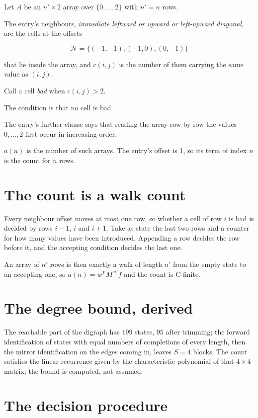\documentclass[11pt]{article}
\theoremstyle{definition}
\begin{document}
Let $A$ be an $n' \times 2$ array over $\{0,\dots,2\}$ with $n' = n$ rows.

The entry's neighbours, {\itshape immediate leftward or upward or left-upward diagonal}, are the cells at the offsets

\[\mathcal{N} = \{(-1,-1), (-1,0), (0,-1)\}\]

that lie inside the array, and $c(i,j)$ is the number of them carrying the same value as $(i,j)$.

Call a cell {\itshape bad} when $c(i,j) > 2$.

The condition is that no cell is bad.

The entry's further clause says that reading the array row by row the values $0,\dots,2$ first occur in increasing order.

$a(n)$ is the number of such arrays. The entry's offset is 1, so its term of index $n$ is the count for $n$ rows.

\section{The count is a walk count}

Every neighbour offset moves at most one row, so whether a cell of row $i$ is bad is decided by rows $i-1$, $i$ and $i+1$. Take as state the last two rows and a counter for how many values have been introduced. Appending a row decides the row before it, and the accepting condition decides the last one.

An array of $n'$ rows is then exactly a walk of length $n'$ from the empty state to an accepting one, so $a(n) = w^{\mathsf T}M^{\,n'}f$ and the count is C-finite.

\section{The degree bound, derived}

The reachable part of the digraph has $199$ states, $95$ after trimming; the forward identification of states with equal numbers of completions of every length, then the mirror identification on the edges coming in, leaves $S = 4$ blocks. The count satisfies the linear recurrence given by the characteristic polynomial of that $4\times4$ matrix; the bound is computed, not assumed.

\section{The decision procedure}
\end{document}
